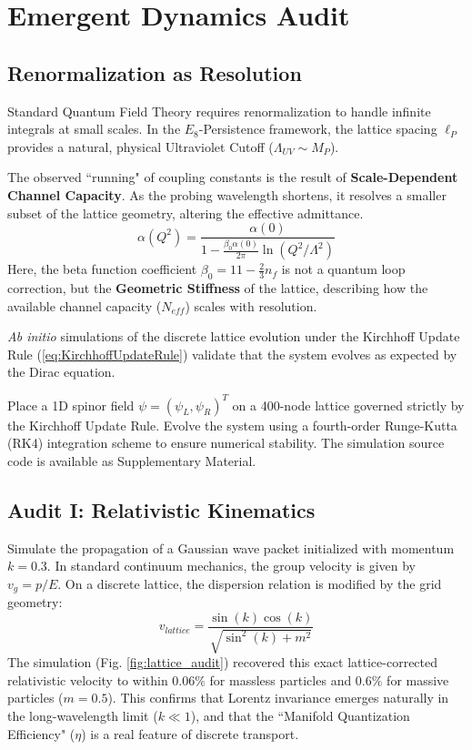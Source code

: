 \section{Emergent Dynamics Audit}

\subsection{Renormalization as Resolution}
Standard Quantum Field Theory requires renormalization to handle infinite integrals at small scales. In the $E_8$-Persistence framework, the lattice spacing $\ell_P$ provides a natural, physical Ultraviolet Cutoff ($\Lambda_{UV} \sim M_P$).

The observed ``running" of coupling constants is the result of \textbf{Scale-Dependent Channel Capacity}. As the probing wavelength shortens, it resolves a smaller subset of the lattice geometry, altering the effective admittance.
\begin{equation}
    \alpha(Q^2) = \frac{\alpha(0)}{1 - \frac{\beta_0 \alpha(0)}{2\pi} \ln(Q^2/\Lambda^2)}
\end{equation}
Here, the beta function coefficient $\beta_0 = 11 - \frac{2}{3}n_f$ is not a quantum loop correction, but the \textbf{Geometric Stiffness} of the lattice, describing how the available channel capacity ($N_{eff}$) scales with resolution. 

\textit{Ab initio} simulations of the discrete lattice evolution  under the Kirchhoff Update Rule (\cref{eq:KirchhoffUpdateRule}) validate that the system evolves as expected by the Dirac equation.

Place a 1D spinor field $\psi = (\psi_L, \psi_R)^T$ on a 400-node lattice governed strictly by the Kirchhoff Update Rule. Evolve the system using a fourth-order Runge-Kutta (RK4) integration scheme to ensure numerical stability. The simulation source code is available as Supplementary Material.

\subsection{Audit I: Relativistic Kinematics}

Simulate the propagation of a Gaussian wave packet initialized with momentum $k=0.3$. In standard continuum mechanics, the group velocity is given by $v_g = p/E$. On a discrete lattice, the dispersion relation is modified by the grid geometry:
\begin{equation}
    v_{lattice} = \frac{\sin(k)\cos(k)}{\sqrt{\sin^2(k) + m^2}}
\end{equation}
The simulation (Fig. \ref{fig:lattice_audit}) recovered this exact lattice-corrected relativistic velocity to within $0.06\%$ for massless particles and $0.6\%$ for massive particles ($m=0.5$). This confirms that Lorentz invariance emerges naturally in the long-wavelength limit ($k \ll 1$), and that the ``Manifold Quantization Efficiency" ($\eta$) is a real feature of discrete transport.

